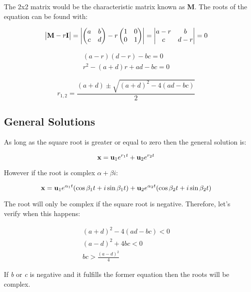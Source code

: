 \documentclass[12pt,letterpaper]{article}
\newcommand{\smatrix}[4]{
	\begin{pmatrix}
		#1 & #2 \\ #3 & #4
	\end{pmatrix}
}
\newcommand{\dmatrix}[4]{
	\begin{vmatrix}
		#1 & #2 \\ #3 & #4
	\end{vmatrix}
}
\newcommand{\bmath}[1]{\text{\textbf{#1}}}
\begin{document}
		The 2x2 matrix would be the characteristic matrix known as \textbf{M}. The roots of the equation can be found with:

		\begin{equation}
			\begin{vmatrix}	\text{\textbf{M}}-r \text{\textbf{I}} \end{vmatrix} = \left| \smatrix{a}{b}{c}{d} - r \smatrix{1}{0}{0}{1} \right| = \dmatrix{a-r}{b}{c}{d-r} = 0
		\end{equation}
		\label{characteristic matrix}

		\begin{align*}
			(a-r)(d-r) - bc = 0 \\
			r^2 -(a+d)r + ad -bc = 0 
		\end{align*}

		\begin{equation}
			r_{1,2} = \frac{(a+d) \pm \sqrt{(a+d)^2-4(ad-bc)}}{2}
		\end{equation}
		\label{roots}

		\subsection{General Solutions}

			As long as the square root is greater or equal to zero then the general solution is:

			\begin{equation}
				\bmath{x} =  \bmath{u}_1 e^{r_1 t} + \bmath{u}_2 e^{r_2 t}
			\end{equation}

			However if the root is complex $\alpha + \beta i$:

			\begin{equation}
				\bmath{x} =  \bmath{u}_1 e^{\alpha_1 t} (\cos{\beta_1 t} + i \sin{\beta_1 t}) +\bmath{u}_2 e^{\alpha_2 t} (\cos{\beta_2 t} + i \sin{\beta_2 t})
			\end{equation}

			The root will only be complex if the square root is negative. Therefore, let's verify when this happens:

			\begin{align*}
				(a+d)^2-4(ad-bc) < 0 \\
				(a-d)^2 +4bc < 0 \\ 
				bc > \frac{(a-d)^2}{4}
			\end{align*}

			If \emph{b} or \emph{c} is negative and it fulfills the former equation then the roots will be complex.
\end{document}
